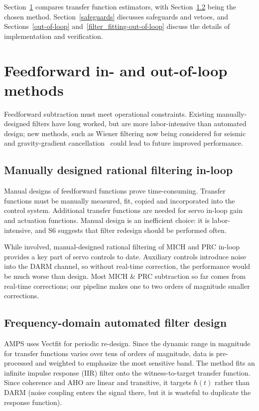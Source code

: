 Section~\ref{prior_programs} compares transfer function estimators, with Section~\ref{vectfit} being the chosen method. Section~\ref{safeguards} discusses safeguards and vetoes, and Sections~\ref{out-of-loop} and~\ref{filter_fitting-out-of-loop} discuss the details of implementation and verification.

    \section{Feedforward in- and out-of-loop methods}
    \label{prior_programs}
   
        Feedforward subtraction must meet operational constraints. Existing manually-designed filters have long worked, but are more labor-intensive than automated design; new methods, such as Wiener filtering now being considered for seismic and gravity-gradient cancellation~\cite{Driggers2012ActiveNoise} could lead to future improved performance.
        
        \subsection{Manually designed rational filtering in-loop}
        \label{manual_design}

            Manual designs of feedforward functions prove time-consuming. Transfer functions must be manually measured, fit, copied and incorporated into the control system. Additional transfer functions are needed for servo in-loop gain and actuation functions. Manual design is an inefficient choice: it is labor-intensive, and S6 suggests that filter redesign should be performed often.

	While involved, manual-designed rational filtering of MICH and PRC in-loop provides a key part of servo controls to date. Auxiliary controls introduce noise into the DARM channel, so  without real-time correction, the performance would be much worse than design. Most MICH \& PRC subtraction so far comes from real-time corrections; our pipeline makes one to two orders of magnitude smaller corrections.

        \subsection{Frequency-domain automated filter design}
        \label{vectfit}

            AMPS uses Vectfit for periodic re-design. Since the dynamic range in magnitude for transfer functions varies over tens of orders of magnitude, data is pre-processed and weighted to emphasize the most sensitive band.
The method fits an infinite impulse response (IIR) filter onto the witness-to-target transfer function. Since coherence and AHO are linear and transitive, it targets $h(t)$ rather than DARM (noise coupling enters the signal there, but it is wasteful to duplicate the response function).

